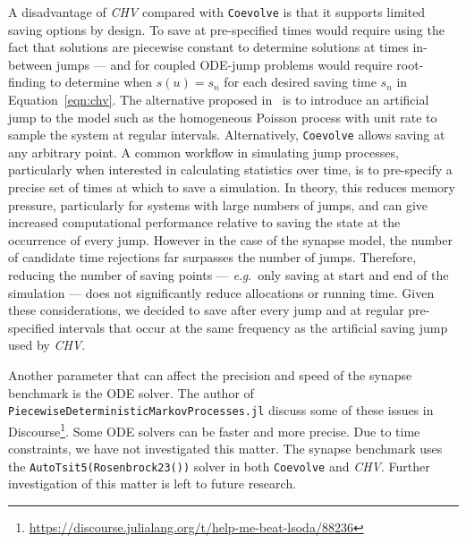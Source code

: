 \documentclass{juliacon}
\numberwithin{equation}{section}
\newcommand{\eg}{\textit{e}.\textit{g}.}
\begin{document}
A disadvantage of \textit{CHV} compared with \texttt{Coevolve} is that it supports limited saving options by design. To save at pre-specified times would require using the fact that solutions are piecewise constant to determine solutions at times in-between jumps --- and for coupled ODE-jump problems would require root-finding to determine when \( s(u) = s_n \) for each desired saving time \( s_n \) in Equation~\ref{eqn:chv}. The alternative proposed in~\cite{veltz2015} is to introduce an artificial jump to the model such as the homogeneous Poisson process with unit rate to sample the system at regular intervals. Alternatively, \texttt{Coevolve} allows saving at any arbitrary point. A common workflow in simulating jump processes, particularly when interested in calculating statistics over time, is to pre-specify a precise set of times at which to save a simulation. In theory, this reduces memory pressure, particularly for systems with large numbers of jumps, and can give increased computational performance relative to saving the state at the occurrence of every jump. However in the case of the synapse model, the number of candidate time rejections far surpasses the number of jumps. Therefore, reducing the number of saving points --- \eg~only saving at start and end of the simulation --- does not significantly reduce allocations or running time. Given these considerations, we decided to save after every jump and at regular pre-specified intervals that occur at the same frequency as the artificial saving jump used by \textit{CHV}.

Another parameter that can affect the precision and speed of the synapse benchmark is the ODE solver. The author of \texttt{PiecewiseDeterministicMarkovProcesses.jl} discuss some of these issues in Discourse\footnote{\url{https://discourse.julialang.org/t/help-me-beat-lsoda/88236}}. Some ODE solvers can be faster and more precise. Due to time constraints, we have not investigated this matter. The synapse benchmark uses the \texttt{AutoTsit5(Rosenbrock23())} solver in both \texttt{Coevolve} and \textit{CHV}. Further investigation of this matter is left to future research. 
\end{document}
